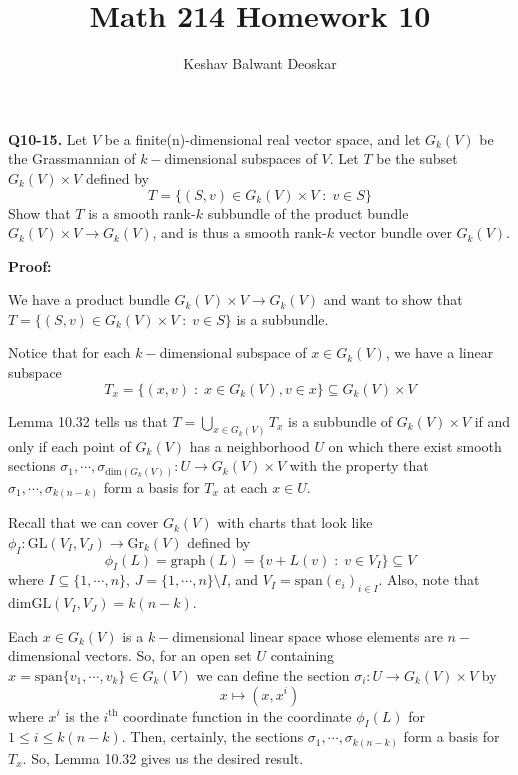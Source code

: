 \documentclass{article}
\title{Math 214 Homework 10}
\author{Keshav Balwant Deoskar}
\begin{document}
\maketitle



\textbf{Q10-15.} Let $V$ be a finite(n)-dimensional real vector space, and let $G_k(V)$ be the Grassmannian of $k-$dimensional subspaces of $V$. Let $T$ be the subset $G_k(V) \times V$ defined by 
\[ T = \{(S, v) \in G_k(V) \times V \;:\; v \in S \} \] Show that $T$ is a smooth rank-$k$ subbundle of the product bundle $G_k(V) \times V \rightarrow G_k(V)$, and is thus a smooth rank-$k$ vector bundle over $G_k(V)$.

\vskip 0.5cm
\textbf{Proof:}

We have a product bundle $G_k(V) \times V \rightarrow G_k(V)$ and want to show that $T = \{(S, v) \in G_k(V) \times V \;:\; v \in S \}$ is a subbundle.

\vskip 0.5cm
Notice that for each $k-$dimensional subspace of $x \in G_k(V)$, we have a linear subspace \[ T_x = \{(x, v) \;:\; x \in G_k(V), v \in x \} \subseteq G_k(V) \times V \]

\vskip 0.5cm
Lemma 10.32 tells us that $T = \bigcup_{x \in G_k(V)} T_x$ is a subbundle of $G_k(V) \times V$ if and only if each point of $G_k(V)$ has a neighborhood $U$ on which there exist smooth sections $\sigma_1, \cdots, \sigma_{\mathrm{dim}(G_k(V))} : U \rightarrow G_k(V) \times V$ with the property that $\sigma_1, \cdots, \sigma_{k(n-k)} $ form a basis for $T_x$ at each $x \in U$.

\vskip 0.5cm
Recall that we can cover $G_k(V)$ with charts that look like $\phi_I : \mathrm{GL}(V_I, V_J) \rightarrow \mathrm{Gr}_k(V)$ defined by 
\[ \phi_I(L) = \mathrm{graph}(L) = \{ v + L(v) \;:\; v \in V_I \} \subseteq V \]
where $I \subseteq \{1, \cdots, n\}$,  $J = \{1, \cdots, n\} \setminus I$, and $V_I = \mathrm{span}(e_i)_{i \in I}$. Also, note that $\mathrm{dim} \mathrm{GL}(V_I, V_J) = k(n-k)$.


\vskip 0.5cm
Each $x \in G_k(V)$ is a $k-$dimensional linear space whose elements are $n-$dimensional vectors. So, for an open set $U$ containing $x = \mathrm{span}\{ v_1, \cdots, v_k \} \in G_k(V)$ we can define the section $\sigma_i : U \rightarrow G_k(V) \times V$ by
\[ x \mapsto (x, x^i) \] where $x^i$ is the $i^{\text{th}}$ coordinate function in the coordinate $\phi_I(L)$ for $1 \leq i \leq k(n-k)$. Then, certainly, the sections $\sigma_1, \cdots, \sigma_{k(n-k)}$ form a basis for $T_x$. So, Lemma 10.32 gives us the desired result.
\end{document}
